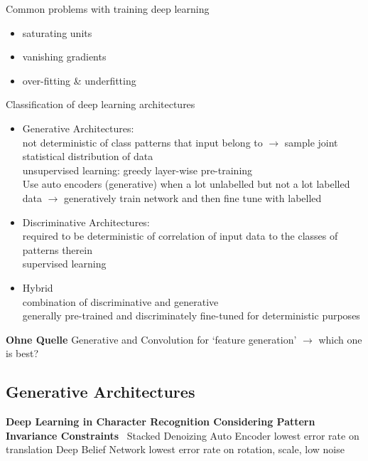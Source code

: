 Common problems with training deep learning
\begin{itemize}
    \item saturating units
    \item vanishing gradients
    \item over-fitting \& underfitting
\end{itemize}

Classification of deep learning architectures
\begin{itemize}
    \item Generative Architectures:\\
        not deterministic of class patterns that input belong to $\rightarrow$ sample joint
        statistical distribution of data\\
        unsupervised learning: greedy layer-wise pre-training\\
        Use auto encoders (generative) when a lot unlabelled but not a lot labelled data
        $\rightarrow$ generatively train network and then fine tune with labelled
    \item Discriminative Architectures:\\
        required to be deterministic of correlation of input data to the classes of patterns therein\\
        supervised learning
    \item Hybrid\\
        combination of discriminative and generative\\
        generally pre-trained and discriminately fine-tuned for deterministic purposes
\end{itemize}


\textbf{Ohne Quelle}
Generative and Convolution for `feature generation' $\rightarrow$ which one is best?



\subsection{Generative Architectures}
\textbf{Deep Learning in Character Recognition Considering Pattern Invariance
Constraints}~\cite{oyedotun_deep_2015}
Stacked Denoizing Auto Encoder lowest error rate on translation
Deep Belief Network lowest error rate on rotation, scale, low noise


